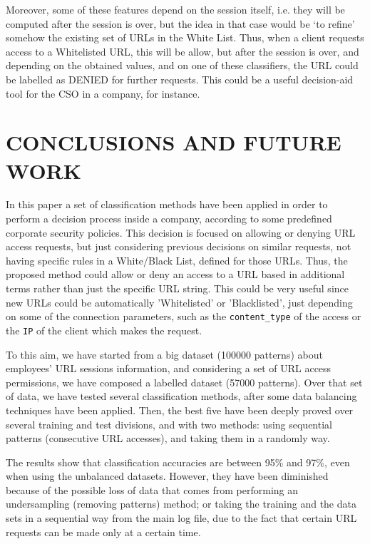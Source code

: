 \documentclass{llncs}
\begin{document}
Moreover, some of these features depend on the session itself, i.e. they will be computed after the session is over, but the idea in that case would be `to refine' somehow the existing set of URLs in the White List.
Thus, when a client requests access to a Whitelisted URL, this will be allow, but after the session is over, and depending on the obtained values, and on one of these classifiers, the URL could be labelled as DENIED for further requests.
This could be a useful decision-aid tool for the CSO in a company, for instance.

%
\section{\uppercase{Conclusions and Future Work}} %
\label{sec:conclusions}

\noindent In this paper a set of classification methods have been applied
in order to perform a decision process inside a company, according to
some predefined corporate security policies. 
This decision is focused on allowing or denying URL access requests, but just considering previous decisions on similar requests, not having specific rules in a White/Black List, defined for those URLs. Thus, the proposed method could allow or deny an access to a URL based in additional terms rather than just the specific URL string. This could be very useful since new URLs could be automatically 'Whitelisted' or 'Blacklisted', just depending on some of the connection parameters, such as the \texttt{content\_type} of the access or the \texttt{IP} of the client which makes the request.

To this aim, we have started from a big dataset (100000 patterns) about employees' URL sessions information, and considering a set of URL access permissions, we have composed a labelled dataset (57000 patterns). Over that set of data, we have tested several classification methods, after some data balancing techniques have been applied. Then, the best five have been deeply proved over several training and test divisions, and with two methods: using sequential patterns (consecutive URL accesses), and taking them in a randomly way.

The results show that classification accuracies are between 95\% and 97\%, even when using the unbalanced datasets. However, they have been diminished because of the possible loss of data that comes from performing an undersampling (removing patterns) method; or taking the training and the data sets in a sequential way from the main log file, due to the fact that certain URL requests can be made only at a certain time.
\end{document}
